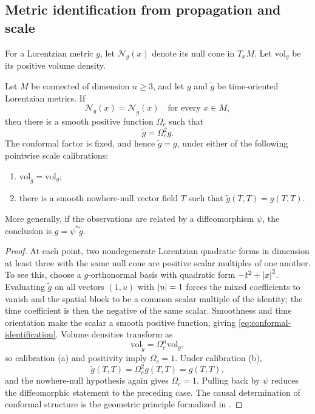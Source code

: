 \subsection{Metric identification from propagation and scale}

For a Lorentzian metric $g$, let $\mathcal N_g(x)$ denote its null cone in $T_xM$.  Let $\mathrm{vol}_g$ be its positive volume density.

\begin{theorem}
\label{thm:null-cone-identification}
Let $M$ be connected of dimension $n\ge3$, and let $g$ and $\widetilde g$ be time-oriented Lorentzian metrics.  If
\begin{equation}
\mathcal N_g(x)=\mathcal N_{\widetilde g}(x)
\quad\text{for every }x\in M,
\label{eq:same-null-cones}
\end{equation}
then there is a smooth positive function $\Omega_c$ such that
\begin{equation}
\widetilde g=\Omega_c^2g.
\label{eq:conformal-identification}
\end{equation}
The conformal factor is fixed, and hence $\widetilde g=g$, under either of the following pointwise scale calibrations:
\begin{enumerate}[label=(\alph*)]
\item $\mathrm{vol}_{\widetilde g}=\mathrm{vol}_g$;
\item there is a smooth nowhere-null vector field $T$ such that $\widetilde g(T,T)=g(T,T)$.
\end{enumerate}
More generally, if the observations are related by a diffeomorphism $\psi$, the conclusion is $g=\psi^*\widetilde g$.
\end{theorem}

\begin{proof}
At each point, two nondegenerate Lorentzian quadratic forms in dimension at least three with the same null cone are positive scalar multiples of one another.  To see this, choose a $g$-orthonormal basis with quadratic form $-t^2+\left|x\right|^2$.  Evaluating $\widetilde g$ on all vectors $(1,u)$ with $\left|u\right|=1$ forces the mixed coefficients to vanish and the spatial block to be a common scalar multiple of the identity; the time coefficient is then the negative of the same scalar.  Smoothness and time orientation make the scalar a smooth positive function, giving \eqref{eq:conformal-identification}.  Volume densities transform as
\[
\mathrm{vol}_{\widetilde g}=\Omega_c^n\mathrm{vol}_g,
\]
so calibration (a) and positivity imply $\Omega_c=1$.  Under calibration (b),
\[
\widetilde g(T,T)=\Omega_c^2g(T,T)=g(T,T),
\]
and the nowhere-null hypothesis again gives $\Omega_c=1$.  Pulling back by $\psi$ reduces the diffeomorphic statement to the preceding case.  The causal determination of conformal structure is the geometric principle formalized in \cite{Malament1977}.
\end{proof}

